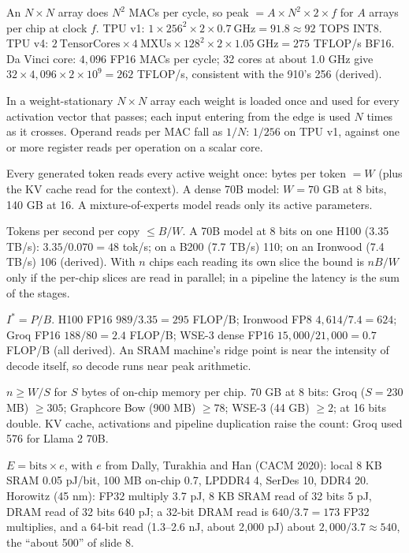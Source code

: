 \documentclass[11pt,letterpaper]{article}
\begin{document}
\begin{description}[leftmargin=0pt,labelindent=0pt,itemsep=6pt,font=\normalfont\bfseries\sffamily]\sloppy
\item[Systolic peak.] An $N\times N$ array does $N^2$ MACs per cycle, so peak $= A\times N^2\times 2\times f$ for $A$ arrays per chip at clock $f$. TPU v1: $1\times256^2\times2\times0.7\ \mathrm{GHz} = 91.8 \approx 92$ TOPS INT8. TPU v4: $2\ \text{TensorCores}\times4\ \text{MXUs}\times128^2\times2\times1.05\ \mathrm{GHz} = 275$ TFLOP/s BF16. Da Vinci core: $4{,}096$ FP16 MACs per cycle; 32 cores at about 1.0 GHz give $32\times4{,}096\times2\times10^9 = 262$ TFLOP/s, consistent with the 910's 256 (derived).
\item[Operand reuse.] In a weight-stationary $N\times N$ array each weight is loaded once and used for every activation vector that passes; each input entering from the edge is used $N$ times as it crosses. Operand reads per MAC fall as $1/N$: $1/256$ on TPU v1, against one or more register reads per operation on a scalar core.
\item[Bytes per token at batch 1.] Every generated token reads every active weight once: bytes per token $= W$ (plus the KV cache read for the context). A dense 70B model: $W = 70$ GB at 8 bits, 140 GB at 16. A mixture-of-experts model reads only its active parameters.
\item[Decode bound.] Tokens per second per copy $\le B/W$. A 70B model at 8 bits on one H100 (3.35 TB/s): $3.35/0.070 = 48$ tok/s; on a B200 (7.7 TB/s) 110; on an Ironwood (7.4 TB/s) 106 (derived). With $n$ chips each reading its own slice the bound is $nB/W$ only if the per-chip slices are read in parallel; in a pipeline the latency is the sum of the stages.
\item[Ridge point.] $I^\ast = P/B$. H100 FP16 $989/3.35 = 295$ FLOP/B; Ironwood FP8 $4{,}614/7.4 = 624$; Groq FP16 $188/80 = 2.4$ FLOP/B; WSE-3 dense FP16 $15{,}000/21{,}000 = 0.7$ FLOP/B (all derived). An SRAM machine's ridge point is near the intensity of decode itself, so decode runs near peak arithmetic.
\item[Chips per model.] $n \ge W/S$ for $S$ bytes of on-chip memory per chip. 70 GB at 8 bits: Groq ($S = 230$ MB) $\ge 305$; Graphcore Bow (900 MB) $\ge 78$; WSE-3 (44 GB) $\ge 2$; at 16 bits double. KV cache, activations and pipeline duplication raise the count: Groq used 576 for Llama 2 70B.
\item[Energy per bit moved.] $E = \text{bits}\times e$, with $e$ from Dally, Turakhia and Han (CACM 2020): local 8 KB SRAM 0.05 pJ/bit, 100 MB on-chip 0.7, LPDDR4 4, SerDes 10, DDR4 20. Horowitz (45 nm): FP32 multiply 3.7 pJ, 8 KB SRAM read of 32 bits 5 pJ, DRAM read of 32 bits 640 pJ; a 32-bit DRAM read is $640/3.7 = 173$ FP32 multiplies, and a 64-bit read (1.3--2.6 nJ, about 2{,}000 pJ) about $2{,}000/3.7 \approx 540$, the ``about 500'' of slide 8.

\end{description}
\end{document}
